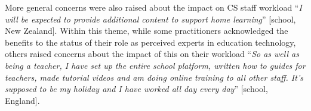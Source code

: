 \documentclass[conference]{IEEEtran}
\begin{document}
More general concerns were also raised about the impact on CS staff
workload ``{\emph{I will be expected to provide additional content to
support home learning}}'' [school, New Zealand]. Within this theme, while some
practitioners acknowledged the benefits to the status of their role as
perceived experts in education technology, others raised concerns
about the impact of this on their workload ``{\emph{So as well as
being a teacher, I have set up the entire school platform, written how
to guides for teachers, made tutorial videos and am doing online
training to all other staff. It's supposed to be my holiday and I have
worked all day every day}}'' [school, England].


\end{document}

